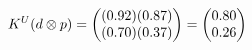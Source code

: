 \documentclass[preview]{standalone}
\begin{document}
\begin{align*}
\special{dvisvgm:raw <g id='unique000'>}K^U(d \otimes p) = \begin{pmatrix} (0.92)(0.87) \\ (0.70)(0.37) \end{pmatrix} = \begin{pmatrix} 0.80 \\ 0.26 \end{pmatrix}\special{dvisvgm:raw </g>}
\end{align*}
\end{document}

